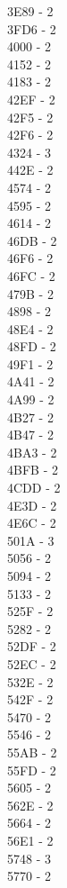 \documentclass[10pt,letterpaper]{article}
\begin{document}
3E89 -  2\\
3FD6 -  2\\
4000 -  2\\
4152 -  2\\
4183 -  2\\
42EF -  2\\
42F5 -  2\\
42F6 -  2\\
4324 -  3\\
442E -  2\\
4574 -  2\\
4595 -  2\\
4614 -  2\\
46DB -  2\\
46F6 -  2\\
46FC -  2\\
479B -  2\\
4898 -  2\\
48E4 -  2\\
48FD -  2\\
49F1 -  2\\
4A41 -  2\\
4A99 -  2\\
4B27 -  2\\
4B47 -  2\\
4BA3 -  2\\
4BFB -  2\\
4CDD -  2\\
4E3D -  2\\
4E6C -  2\\
501A -  3\\
5056 -  2\\
5094 -  2\\
5133 -  2\\
525F -  2\\
5282 -  2\\
52DF -  2\\
52EC -  2\\
532E -  2\\
542F -  2\\
5470 -  2\\
5546 -  2\\
55AB -  2\\
55FD -  2\\
5605 -  2\\
562E -  2\\
5664 -  2\\
56E1 -  2\\
5748 -  3\\
5770 -  2\\
\end{document}
